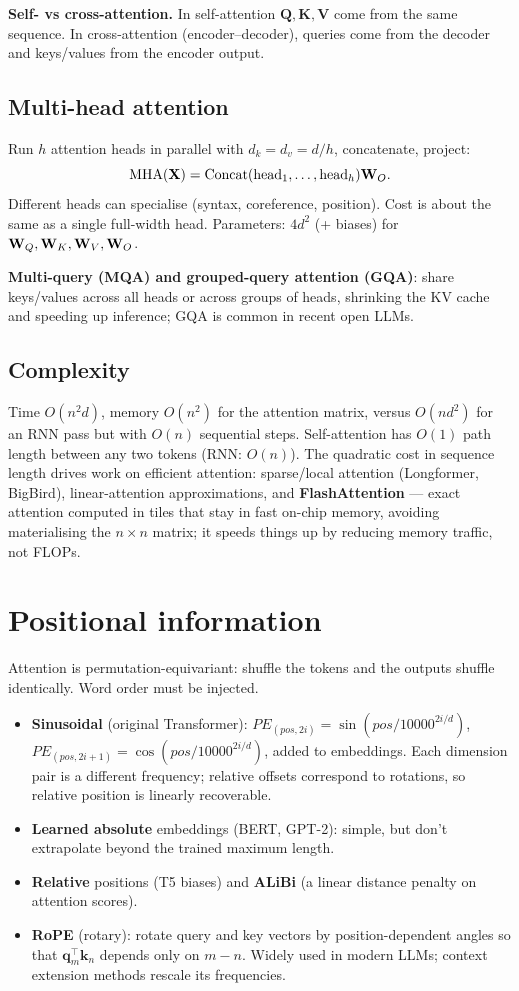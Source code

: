 \textbf{Self- vs cross-attention.} In self-attention $\mathbf{Q},\mathbf{K},\mathbf{V}$ come from the same sequence. In cross-attention (encoder--decoder), queries come from the decoder and keys/values from the encoder output.

\subsection{Multi-head attention}
Run $h$ attention heads in parallel with $d_k=d_v=d/h$, concatenate, project:
\[\operatorname{MHA}(\mathbf{X})=\operatorname{Concat}(\text{head}_1,\dots,\text{head}_h)\mathbf{W}_O.\]
Different heads can specialise (syntax, coreference, position). Cost is about the same as a single full-width head. Parameters: $4d^2$ (+ biases) for $\mathbf{W}_Q,\mathbf{W}_K,\mathbf{W}_V,\mathbf{W}_O$.

\textbf{Multi-query (MQA) and grouped-query attention (GQA)}: share keys/values across all heads or across groups of heads, shrinking the KV cache and speeding up inference; GQA is common in recent open LLMs.

\subsection{Complexity}
Time $O(n^2d)$, memory $O(n^2)$ for the attention matrix, versus $O(nd^2)$ for an RNN pass but with $O(n)$ sequential steps. Self-attention has $O(1)$ path length between any two tokens (RNN: $O(n)$). The quadratic cost in sequence length drives work on efficient attention: sparse/local attention (Longformer, BigBird), linear-attention approximations, and \textbf{FlashAttention} --- exact attention computed in tiles that stay in fast on-chip memory, avoiding materialising the $n\times n$ matrix; it speeds things up by reducing memory traffic, not FLOPs.

\section{Positional information}
Attention is permutation-equivariant: shuffle the tokens and the outputs shuffle identically. Word order must be injected.
\begin{itemize}
  \item \textbf{Sinusoidal} (original Transformer): $PE_{(pos,2i)}=\sin(pos/10000^{2i/d})$, $PE_{(pos,2i+1)}=\cos(pos/10000^{2i/d})$, added to embeddings. Each dimension pair is a different frequency; relative offsets correspond to rotations, so relative position is linearly recoverable.
  \item \textbf{Learned absolute} embeddings (BERT, GPT-2): simple, but don't extrapolate beyond the trained maximum length.
  \item \textbf{Relative} positions (T5 biases) and \textbf{ALiBi} (a linear distance penalty on attention scores).
  \item \textbf{RoPE} (rotary): rotate query and key vectors by position-dependent angles so that $\mathbf{q}_m^\top\mathbf{k}_n$ depends only on $m-n$. Widely used in modern LLMs; context extension methods rescale its frequencies.
\end{itemize}

